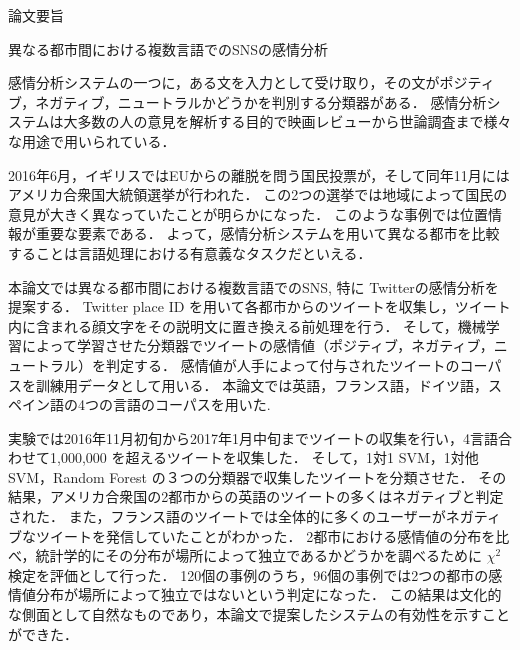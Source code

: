 \thispagestyle{empty}
\vspace*{2.0cm}

\begin{center}
\LARGE{論文要旨}
\end{center}
\vspace*{3mm}

\begin{center}
\LARGE{異なる都市間における複数言語でのSNSの感情分析}
\end{center}

\vspace{20mm}
\setlength\parindent{1zw}
感情分析システムの一つに，ある文を入力として受け取り，その文がポジティブ，ネガティブ，ニュートラルかどうかを判別する分類器がある．
感情分析システムは大多数の人の意見を解析する目的で映画レビューから世論調査まで様々な用途で用いられている．

2016年6月，イギリスではEUからの離脱を問う国民投票が，そして同年11月にはアメリカ合衆国大統領選挙が行われた．
この2つの選挙では地域によって国民の意見が大きく異なっていたことが明らかになった．
このような事例では位置情報が重要な要素である．
よって，感情分析システムを用いて異なる都市を比較することは言語処理における有意義なタスクだといえる．

本論文では異なる都市間における複数言語でのSNS, 特に Twitterの感情分析を提案する．
Twitter place ID を用いて各都市からのツイートを収集し，ツイート内に含まれる顔文字をその説明文に置き換える前処理を行う．
そして，機械学習によって学習させた分類器でツイートの感情値（ポジティブ，ネガティブ，ニュートラル）を判定する．
感情値が人手によって付与されたツイートのコーパスを訓練用データとして用いる．
本論文では英語，フランス語，ドイツ語，スペイン語の4つの言語のコーパスを用いた.

実験では2016年11月初旬から2017年1月中旬までツイートの収集を行い，4言語合わせて1,000,000 を超えるツイートを収集した．
そして，1対1 SVM，1対他 SVM，Random Forest の３つの分類器で収集したツイートを分類させた．
その結果，アメリカ合衆国の2都市からの英語のツイートの多くはネガティブと判定された．
また，フランス語のツイートでは全体的に多くのユーザーがネガティブなツイートを発信していたことがわかった．
2都市における感情値の分布を比べ，統計学的にその分布が場所によって独立であるかどうかを調べるために $\chi^2$ 検定を評価として行った．
120個の事例のうち，96個の事例では2つの都市の感情値分布が場所によって独立ではないという判定になった．
この結果は文化的な側面として自然なものであり，本論文で提案したシステムの有効性を示すことができた．

